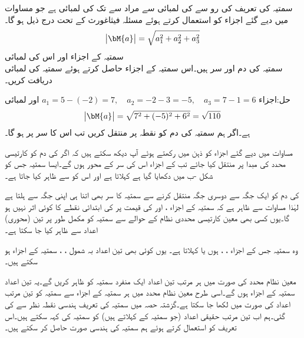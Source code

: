 سمتیہ کی تعریف کی رو سے   کی لمبائی سے مراد  سے  تک کی لمبائی  ہے جو مساوات  میں دیے گئے اجزاء کو استعمال کرتے ہوئے مسئلہ فیثاغورث کے تحت درج ذیل ہو گا۔
\begin{align}
\abs{\bM{a}}=\sqrt{a_1^2+a_2^2+a_3^2}
\end{align} 
\quad سمتیہ کے اجزاء اور اس کی لمبائی\\
سمتیہ  کی دم  اور سر  ہیں۔اس سمتیہ کے اجزاء حاصل کرتے ہوئے سمتیہ کی لمبائی دریافت کریں۔

حل:اجزاء 
$a_1=5-(-2)=7,\quad a_2=-2-3=-5,\quad a_3=7-1=6$
اور لمبائی
\begin{align*}
\abs{\bM{a}}=\sqrt{7^2+(-5)^2+6^2}=\sqrt{110}
\end{align*}
ہے۔اگر ہم سمتیہ  کی دم کو نقطہ  پر منتقل کریں تب اس کا سر  پر ہو گا۔

مساوات  میں دیے گئے اجزاء کو ذہن میں رکھتے ہوئے آپ دیکھ سکتے ہیں کہ اگر  کی دم کو کارتیسی محدد کی مبدا پر منتقل کیا جائے تب  کے اجزاء اس کی سر کے محور ہوں گے۔ایسا سمتیہ جس کو شکل -ب میں دکھایا گیا ہے   کہلاتا ہے اور اس کو  سے ظاہر کیا جاتا ہے۔ 

 کی دم کو ایک جگہ سے دوسری جگہ منتقل کرنے سے سمتیہ کا سر بھی اتنا ہی اپنی جگہ سے ہلتا ہے لہٰذا مساوات  سے ظاہر ہے کہ سمتیہ  کے اجزاء ،  اور  کی قیمت پر  کی ابتدائی نقطے کا کوئی اثر نہیں ہو گا۔یوں کسی بھی معین کارتیسی محددی نظام کے حوالے سے سمتیہ کو مکمل طور پر تین (محوری) اعداد سے ظاہر کیا جا سکتا ہے۔

 وہ سمتیہ  جس کے اجزاء ، ،  ہوں  یا   کہلاتا ہے۔ یوں کوئی بھی تین اعداد بہ شمول  ، ،  سمتیہ کے اجزاء ہو سکتے ہیں۔

معین نظام محدد کی صورت میں  ہر مرتب تین اعداد ایک منفرد سمتیہ کو ظاہر کریں گے۔یہ تین اعداد سمتیہ کے اجزاء ہوں گے۔اسی طرح معین نظام محدد میں ہر سمتیہ کے اجزاء سے سمتیہ کو تین مرتب اعداد کی صورت میں لکھا جا سکتا ہے۔گزشتہ حصہ میں سمتیہ کی تعریف ہندسی نقطہ نظر سے کی گئی۔ہم اب تین مرتب حقیقی اعداد (جو سمتیہ کے  کہلاتے ہیں) کو سمتیہ کی  کہہ سکتے ہیں۔اس تعریف کو  استعمال کرتے ہوئے ہم سمتیہ کی ہندسی صورت حاصل کر سکتے ہیں۔  

